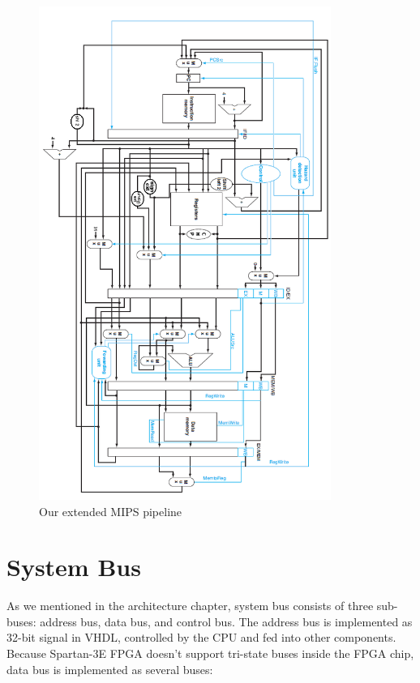 \documentclass[oneside]{book}
\begin{document}
\begin{figure}[H]
\begin{center}
\includegraphics[width=0.85\textwidth]{pipeline.png}
\end{center}
\caption{Our extended MIPS pipeline}
\label{pipeline}
\end{figure}

\section {System Bus}

As we mentioned in the architecture chapter, system bus consists of three
sub-buses: address bus, data bus, and control bus. The address bus is
implemented as 32-bit signal in VHDL, controlled by the CPU and fed into
other components. Because Spartan-3E FPGA doesn't support tri-state buses
inside the FPGA chip, data bus is implemented as several buses:
\end{document}
